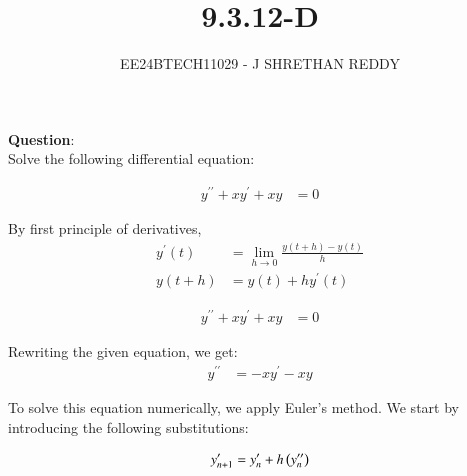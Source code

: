 \documentclass[journal]{IEEEtran}
\begin{document}

\vspace{3cm}

\title{9.3.12-D}
\author{EE24BTECH11029 - J SHRETHAN REDDY}
\maketitle
{\let\newpage\relax\maketitle}

\renewcommand{\thefigure}{\theenumi}
\renewcommand{\thetable}{\theenumi}
\setlength{\intextsep}{10pt} %


\renewcommand{\thetable}{\theenumi}

\textbf{Question}:\\
Solve the following differential equation:

\begin{align}
 y^{\prime\prime} + x y^{\prime} + xy &= 0
\end{align}
\solution

By first principle of derivatives,
\begin{align}
    y^{\prime}(t) &= \lim_{h\to 0}\frac{y(t+h) - y(t)}{h} \\
    y(t+h) &= y(t) + hy^{\prime}(t)
\end{align}

\begin{align}
 y^{\prime\prime} + x y^{\prime} + xy &= 0
\end{align}

Rewriting the given equation, we get:
\begin{align}
  y^{\prime\prime}&= -xy^{\prime} - xy
\end{align}

To solve this equation numerically, we apply Euler's method. We start by introducing the following substitutions:

\begin{align}
  y^{\prime}_{n+1}=y^{\prime}_{n}+h\left(y^{\prime\prime}_{n}\right)
  \end{align}
      
\end{document}
